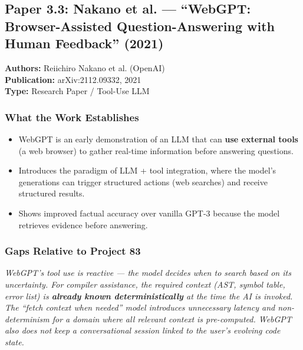 \documentclass[a4paper,11pt]{article}
\newcommand{\papergap}[1]{%
  \begin{tcolorbox}[colback=red!5!white, colframe=red!60!black, title={Research Gap Identified}]
  \textit{#1}
  \end{tcolorbox}
}
\begin{document}
\subsection{Paper 3.3: Nakano et al. --- ``WebGPT: Browser-Assisted Question-Answering with Human Feedback'' (2021)}

\begin{tcolorbox}[colback=gray!5, colframe=gray!40]
\textbf{Authors:} Reiichiro Nakano et al. (OpenAI) \\
\textbf{Publication:} arXiv:2112.09332, 2021 \\
\textbf{Type:} Research Paper / Tool-Use LLM
\end{tcolorbox}

\subsubsection{What the Work Establishes}

\begin{itemize}
    \item WebGPT is an early demonstration of an LLM that can \textbf{use external tools} (a web browser) to gather real-time information before answering questions.
    \item Introduces the paradigm of LLM + tool integration, where the model's generations can trigger structured actions (web searches) and receive structured results.
    \item Shows improved factual accuracy over vanilla GPT-3 because the model retrieves evidence before answering.
\end{itemize}

\subsubsection{Gaps Relative to Project 83}

\papergap{WebGPT's tool use is reactive --- the model decides \textit{when} to search based on its uncertainty. For compiler assistance, the required context (AST, symbol table, error list) is \textbf{already known deterministically} at the time the AI is invoked. The ``fetch context when needed'' model introduces unnecessary latency and non-determinism for a domain where all relevant context is pre-computed. WebGPT also does not keep a conversational session linked to the user's evolving code state.}
\end{document}
